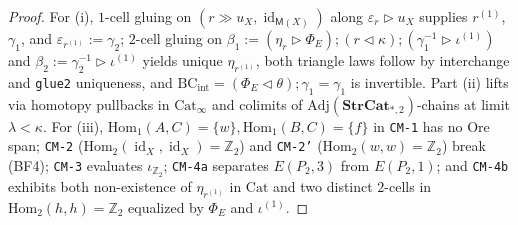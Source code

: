 \documentclass[11pt]{article}
\theoremstyle{plain}
\theoremstyle{definition}
\newcommand{\Cat}{\mathrm{Cat}}
\DeclareMathOperator{\id}{id}
\begin{document}
\begin{proof}
For (i), $1$-cell gluing on $(r \gg u_X, \id_{\mathsf{M}(X)})$ along $\varepsilon_r \triangleright u_X$ supplies $r^{(1)}$, $\gamma_1$, and $\varepsilon_{r^{(1)}} := \gamma_2$; $2$-cell gluing on $\beta_1 := (\eta_r \triangleright \Phi_E) \mathbin{;} (r \triangleleft \kappa) \mathbin{;} (\gamma_1^{-1} \triangleright \iota^{(1)})$ and $\beta_2 := \gamma_2^{-1} \triangleright \iota^{(1)}$ yields unique $\eta_{r^{(1)}}$, both triangle laws follow by interchange and \texttt{glue2} uniqueness, and $\mathrm{BC}_{\mathrm{int}} = (\Phi_E \triangleleft \theta) \mathbin{;} \gamma_1 = \gamma_1$ is invertible. Part (ii) lifts via homotopy pullbacks in $\Cat_\infty$ and colimits of $\mathrm{Adj}(\mathbf{StrCat}_{*,2})$-chains at limit $\lambda < \kappa$. For (iii), $\mathrm{Hom}_1(A,C)=\{w\}, \mathrm{Hom}_1(B,C)=\{f\}$ in \texttt{CM-1} has no Ore span; \texttt{CM-2} ($\mathrm{Hom}_2(\id_X,\id_X)=\mathbb{Z}_2$) and \texttt{CM-2'} ($\mathrm{Hom}_2(w,w)=\mathbb{Z}_2$) break (BF4); \texttt{CM-3} evaluates $\iota_{\mathbb{Z}_2}$; \texttt{CM-4a} separates $E(P_2,3)$ from $E(P_2,1)$; and \texttt{CM-4b} exhibits both non-existence of $\eta_{r^{(1)}}$ in $\Cat$ and two distinct $2$-cells in $\mathrm{Hom}_2(h,h)=\mathbb{Z}_2$ equalized by $\Phi_E$ and $\iota^{(1)}$.
\end{proof}
\end{document}
